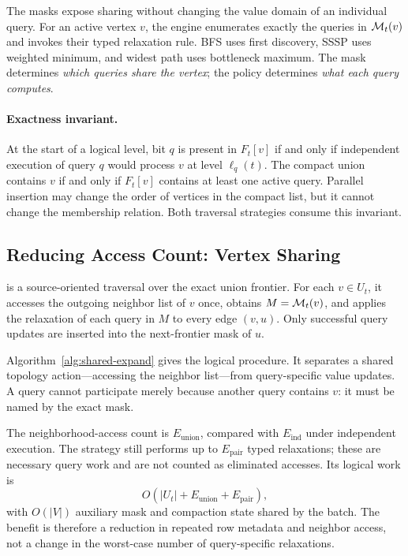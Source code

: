 

The masks expose sharing without changing the value domain of an individual query.  For an active vertex $v$, the engine enumerates exactly the queries in $\mathcal{M}_t(v)$ and invokes their typed relaxation rule.  BFS uses first discovery, SSSP uses weighted minimum, and widest path uses bottleneck maximum.  The mask determines \emph{which queries share the vertex}; the policy determines \emph{what each query computes}.

\paragraph{Exactness invariant.}
At the start of a logical level, bit $q$ is present in $F_t[v]$ if and only if independent execution of query $q$ would process $v$ at level $\ell_q(t)$.  The compact union contains $v$ if and only if $F_t[v]$ contains at least one active query.  Parallel insertion may change the order of vertices in the compact list, but it cannot change the membership relation.  Both traversal strategies consume this invariant.

\subsection{Reducing Access Count: Vertex Sharing}
\label{sec:sharedexpand}

\sharedexpand is a source-oriented traversal over the exact union frontier.  For each $v\in U_t$, it accesses the outgoing neighbor list of $v$ once, obtains $M=\mathcal{M}_t(v)$, and applies the relaxation of each query in $M$ to every edge $(v,u)$.  Only successful query updates are inserted into the next-frontier mask of $u$.

Algorithm~\ref{alg:shared-expand} gives the logical procedure.  It separates a shared topology action---accessing the neighbor list---from query-specific value updates.  A query cannot participate merely because another query contains $v$: it must be named by the exact mask.



The neighborhood-access count is $E_{\mathrm{union}}$, compared with $E_{\mathrm{ind}}$ under independent execution.  The strategy still performs up to $E_{\mathrm{pair}}$ typed relaxations; these are necessary query work and are not counted as eliminated accesses.  Its logical work is
\begin{equation}
  O(|U_t|+E_{\mathrm{union}}+E_{\mathrm{pair}}),
\end{equation}
with $O(|V|)$ auxiliary mask and compaction state shared by the batch.  The benefit is therefore a reduction in repeated row metadata and neighbor access, not a change in the worst-case number of query-specific relaxations.

